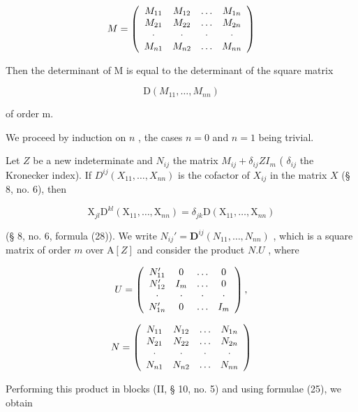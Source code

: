 \[
M = \left( \begin{array}{c c c c} M _ {1 1} & M _ {1 2} & \ldots & M _ {1 n} \\ M _ {2 1} & M _ {2 2} & \ldots & M _ {2 n} \\ \cdot & \cdot & \cdot & \cdot \\ M _ {n 1} & M _ {n 2} & \ldots & M _ {n n} \end{array} \right)
\]

Then the determinant of M is equal to the determinant of the square matrix

\[
\mathrm{D} (M _ {1 1}, \dots , M _ {n n})
\]

of order m.

We proceed by induction on \(n\) , the cases \(n = 0\) and \(n = 1\) being trivial.

Let \(Z\) be a new indeterminate and \(N_{ij}\) the matrix \(M_{ij} + \delta_{ij}ZI_m\) ( \(\delta_{ij}\) the Kronecker index). If \(D^{ij}(X_{11},\ldots,X_{nn})\) is the cofactor of \(X_{ij}\) in the matrix \(X\) (§ 8, no. 6), then

\[
\mathrm{X} _ {j l} \mathrm{D} ^ {k l} (\mathrm{X} _ {1 1}, \dots , \mathrm{X} _ {n n}) = \delta_ {j k} \mathrm{D} (\mathrm{X} _ {1 1}, \dots , \mathrm{X} _ {n n})\tag{25}
\]

(§ 8, no. 6, formula (28)). We write \(N_{ij}' = \mathbf{D}^{ij}(N_{11}, \ldots, N_{nn})\) , which is a square matrix of order \(m\) over \(\mathrm{A}[Z]\) and consider the product \(N.U\) , where

\[
U = \left( \begin{array}{c c c c} N _ {1 1} ^ {\prime} & 0 & \ldots & 0 \\ N _ {1 2} ^ {\prime} & I _ {m} & \ldots & 0 \\ \cdot & \cdot & \cdot & \cdot \\ N _ {1 n} ^ {\prime} & 0 & \ldots & I _ {m} \end{array} \right),
\]

\[
N = \left( \begin{array}{c c c c} N _ {1 1} & N _ {1 2} & \ldots & N _ {1 n} \\ N _ {2 1} & N _ {2 2} & \ldots & N _ {2 n} \\ \cdot & \cdot & \cdot & \cdot \\ N _ {n 1} & N _ {n 2} & \ldots & N _ {n n} \end{array} \right)
\]

Performing this product in blocks (II, § 10, no. 5) and using formulae (25), we obtain

